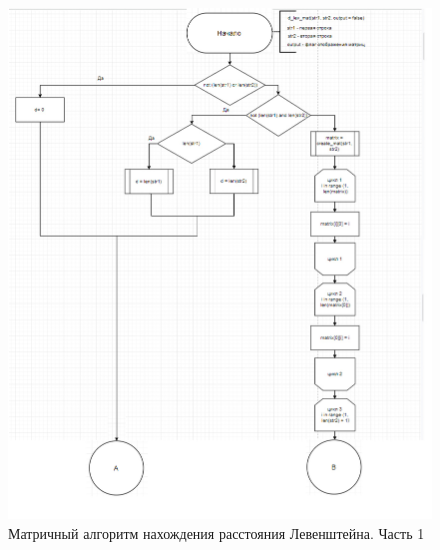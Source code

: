 \documentclass[a4paper,12pt]{report}
\begin{document}
\begin{center}
		\newpage
		\begin{figure}[h!]
			\includegraphics[width=1\linewidth]{lev_mat.jpg}
			\caption{Матричный алгоритм нахождения расстояния Левенштейна. Часть 1}
			\label{ris:matLev1}
		\end{figure}
	

\end{center}
\end{document}
